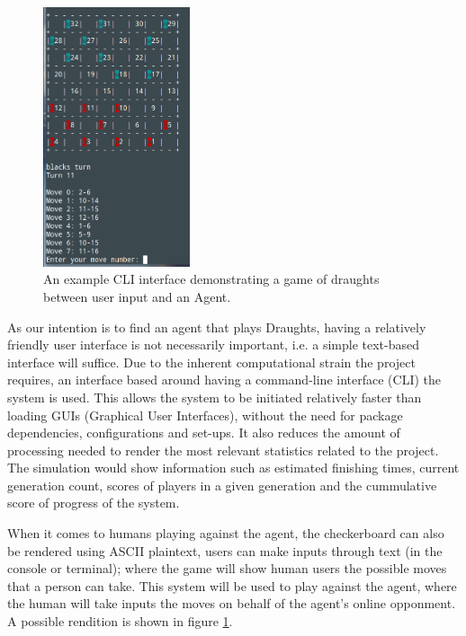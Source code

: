 \documentclass[12pt,a4paper]{article}
\begin{document}
    \begin{figure}
        \vspace{-30pt}
        \centering
        \caption{An example CLI interface demonstrating a game of draughts between user input and an Agent. \label{cli_humaninput}}
        \includegraphics[width=43mm]{cli_humanvsagent.png}
        \vspace{-20pt}
    \end{figure}

    As our intention is to find an agent that plays Draughts, having a relatively friendly user interface is not necessarily important, i.e. a simple text-based interface will suffice. Due to the inherent computational strain the project requires, an interface based around having a command-line interface (CLI) the system is used. This allows the system to be initiated relatively faster than loading GUIs (Graphical User Interfaces), without the need for package dependencies, configurations and set-ups. It also reduces the amount of processing needed to render the most relevant statistics related to the project. The simulation would show information such as estimated finishing times, current generation count, scores of players in a given generation and the cummulative score of progress of the system.

    When it comes to humans playing against the agent, the checkerboard can also be rendered using ASCII plaintext, users can make inputs through text (in the console or terminal); where the game will show human users the possible moves that a person can take. This system will be used to play against the agent, where the human will take inputs the moves on behalf of the agent's online opponment. A possible rendition is shown in figure \ref{cli_humaninput}.
\end{document}
